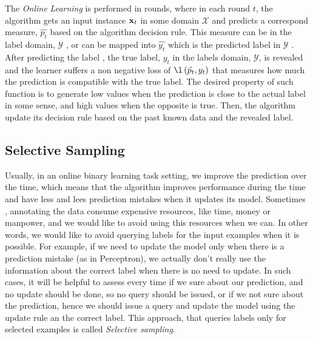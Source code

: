 %


The \textit{Online Learning} is performed in rounds, where in each round $t$, 
the algorithm gets an input instance $\mathbf{x}_{t}$ in some domain $\mathcal{X}$  and predicts a  correspond 
measure, $\hat{p_t}$ based on the algorithm decision  rule. This measure can be in the label domain, 
$\mathcal{Y}$ , or can be mapped into $\hat{y_t}$ which is the predicted label in $\mathcal{Y}$ .   
After predicting the label , the true label, $y_t$ in the labels domain, $\mathcal{Y}$, is revealed 
and the learner suffers a non negative loss of $\l\paren{\hat{p_t},y_t}$ that measures how much the 
prediction is compatible with the true label. The desired property of such function is to generate low 
values when the prediction is close to the actual label in some sense, and high values when the opposite 
is true. Then, the algorithm update its decision rule based on the past known data and the revealed label. 

\subsection{Selective Sampling}

Usually, in an   online binary learning task setting,  we improve the prediction over the time, 
which means that the algorithm improves performance during the time and have less and lees prediction
 mistakes when it updates its model. 
Sometimes , annotating the data consume expensive resources, like time, money or manpower, 
and we would like to avoid using this resources when we can. In other words, we would like 
to avoid querying labels for the input examples when it is possible. For example, if we need to update the 
model only when there is a prediction mistake (as in Perceptron), we actually don't really 
use the information about the correct label when there is no need to update. In such cases, 
it will be helpful to assess every time if we sure about our prediction, and no update should be done, 
so no query should be issued, or if we not sure about the prediction, hence we should issue a 
query and update the model using the update rule an the correct label. 
This approach, that queries labels only for selected examples is called \textit{Selective sampling.}

